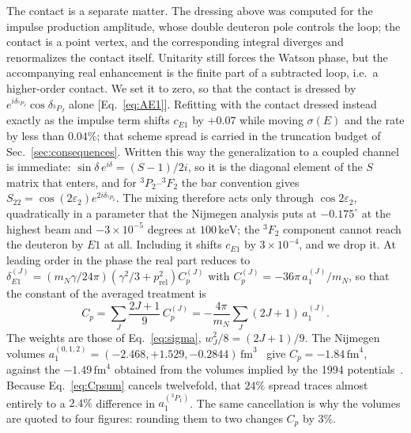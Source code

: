 \documentclass[
  aps,prd,twocolumn,nofootinbib,superscriptaddress,
  longbibliography,floatfix,preprintnumbers
]{revtex4-2}
\newcommand{\prel}{p_{\mathrm{rel}}}
\newcommand{\Eone}{E1}
\begin{document}
The contact is a separate matter.  The dressing above was computed for the impulse
production amplitude, whose double deuteron pole controls the loop; the contact is a
point vertex, and the corresponding integral diverges and renormalizes the contact
itself.  Unitarity still forces the Watson phase, but the accompanying real
enhancement is the finite part of a subtracted loop, i.e.\ a higher-order contact.
We set it to zero, so that the contact is dressed by
$e^{i\delta_{^{3}P_{J}}}\cos\delta_{^{3}P_{J}}$ alone [Eq.~\eqref{eq:AE1}].
Refitting with the contact dressed instead exactly as the impulse term shifts
$c_{\Eone}$ by $+0.07$ while moving $\sigma(E)$ and the rate by less than
$0.04\%$; that scheme spread is carried in the truncation budget of
Sec.~\ref{sec:consequences}.  Written this
way the generalization to a coupled channel is immediate:
$\sin\delta\,e^{i\delta}=(S-1)/2i$, so it is the diagonal element of the $S$ matrix
that enters, and for ${}^{3}P_{2}$--${}^{3}F_{2}$ the bar convention gives
$S_{22}=\cos(2\varepsilon_{2})e^{2i\delta_{^{3}P_{2}}}$.  The mixing therefore acts
only through $\cos2\varepsilon_{2}$, quadratically in a parameter that the Nijmegen
analysis puts at $-0.175^{\circ}$ at the highest beam and $-3\times10^{-5}$ degrees
at $100\,\mathrm{keV}$; the ${}^{3}F_{2}$ component cannot reach the deuteron by
$\Eone$ at all.  Including it shifts $c_{\Eone}$ by $3\times10^{-4}$, and we drop it.
At leading
order in the phase the real part reduces to
$\delta_{\Eone}^{(J)}=(m_{N}\gamma/24\pi)(\gamma^{2}/3+\prel^{2})C_{p}^{(J)}$ with
$C_{p}^{(J)}=-36\pi\,a_{1}^{(J)}/m_{N}$, so that the constant of the averaged
treatment is
\begin{equation}
  C_{p}=\sum_{J}\frac{2J+1}{9}\,C_{p}^{(J)}
       =-\frac{4\pi}{m_{N}}\sum_{J}(2J+1)\,a_{1}^{(J)} .
  \label{eq:Cpsum}
\end{equation}
The weights are those of Eq.~\eqref{eq:sigma}, $w_{J}^{2}/8=(2J+1)/9$.  The
Nijmegen volumes $a_{1}^{(0,1,2)}=(-2.468,+1.529,-0.2844)\,\mathrm{fm}^{3}$~\cite{Stoks:1993tb,PavonValderrama:2004se}
give $C_{p}=-1.84\,\mathrm{fm}^{4}$, against the $-1.49\,\mathrm{fm}^{4}$ obtained
from the volumes implied by the 1994 potentials~\cite{Chen:1999bg,Rupak:1999rk}.
Because Eq.~\eqref{eq:Cpsum} cancels twelvefold, that $24\%$ spread traces almost
entirely to a $2.4\%$ difference in $a_{1}^{(^{3}P_{1})}$. The same cancellation is why
the volumes are quoted to four figures: rounding them to two changes $C_{p}$ by $3\%$.




\end{document}
